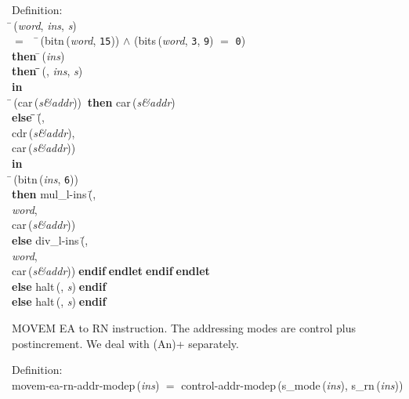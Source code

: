 \begin{tabbing}{\sc Definition}: \\  
\=\,({\it{word\/}}, {\it{ins\/}}, {\it{s\/}}) \\ 
$=$$\;\;\;\;$\=\,({\rm{bitn}}\,({\it{word\/}}, {\tt{15}})) $\wedge$ ({\rm{bits}}\,({\it{word\/}}, {\tt{3}}, {\tt{9}}) $=$ {\tt{0}}) \\ 
{\bf then }\=\,({\it{ins\/}}) \\ 
{\bf then }\=\=\,({}, {\it{ins\/}}, {\it{s\/}})\- \\ 
{\bf in} \\ 
\=\,({\rm{car}}\,({\it{s\&addr\/}}))$\;\;${\bf then }{\rm{car}}\,({\it{s\&addr\/}}) \\ 
{\bf else }\=\=\,(\=, \\ 
{\rm{cdr}}\,({\it{s\&addr\/}}), \\ 
{\rm{car}}\,({\it{s\&addr\/}}))\-\- \\ 
{\bf in} \\ 
\=\,({\rm{bitn}}\,({\it{ins\/}}, {\tt{6}})) \\ 
{\bf then }{\rm{mul\_l-ins}}\,(\=, \\ 
{\it{word\/}}, \\ 
{\rm{car}}\,({\it{s\&addr\/}}))\- \\ 
{\bf else }{\rm{div\_l-ins}}\,(\=, \\ 
{\it{word\/}}, \\ 
{\rm{car}}\,({\it{s\&addr\/}}))\-$\;${\bf  endif}\-$\;${\bf  endlet}\-$\;${\bf  endif}\-$\;${\bf  endlet}\- \\ 
{\bf else }{\rm{halt}}\,({}, {\it{s\/}})$\;${\bf  endif}\- \\ 
{\bf else }{\rm{halt}}\,({}, {\it{s\/}})$\;${\bf  endif}\-\-
\end{tabbing}

 MOVEM EA to RN instruction.
 The addressing modes are control plus postincrement.  We deal with
 (An)+ separately.
\begin{tabbing}{\sc Definition}: \\  
{\rm{movem-ea-rn-addr-modep}}\,({\it{ins\/}}) $=$ {\rm{control-addr-modep}}\,({\rm{s\_mode}}\,({\it{ins\/}}), {\rm{s\_rn}}\,({\it{ins\/}}))
\end{tabbing}

